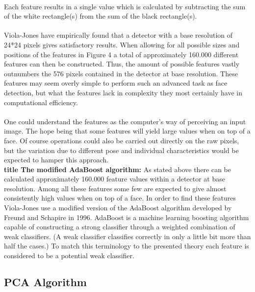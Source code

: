 \documentclass[a4paper, 12pt]{report}
\begin{document}
\paragraph{}
Each feature results in a single value which is calculated by subtracting the sum of the
white rectangle(s) from the sum of the black rectangle(s).\paragraph{}
Viola-Jones have empirically found that a detector with a base resolution of 24*24 pixels
gives satisfactory results. When allowing for all possible sizes and positions of the features in
Figure 4 a total of approximately 160.000 different features can then be constructed. Thus, the
amount of possible features vastly outnumbers the 576 pixels contained in the detector at base
resolution. These features may seem overly simple to perform such an advanced task as face
detection, but what the features lack in complexity they most certainly have in computational
efficiency.\paragraph{}
One could understand the features as the computer’s way of perceiving an input image.
The hope being that some features will yield large values when on top of a face. Of course
operations could also be carried out directly on the raw pixels, but the variation due to different
pose and individual characteristics would be expected to hamper this approach.\\
\textbf{title The modified AdaBoost algorithm:} As stated above there can be calculated
approximately 160.000 feature values within a detector at base resolution. Among all these features some few are expected to give almost consistently high values when on top of a face.
In order to find these features Viola-Jones use a modified version of the AdaBoost algorithm
developed by Freund and Schapire in 1996.
AdaBoost is a machine learning boosting algorithm capable of constructing a strong classifier through a weighted combination of weak classifiers. (A weak classifier classifies correctly
in only a little bit more than half the cases.) To match this terminology to the presented theory
each feature is considered to be a potential weak classifier.
\subsection{PCA Algorithm}
\end{document}
